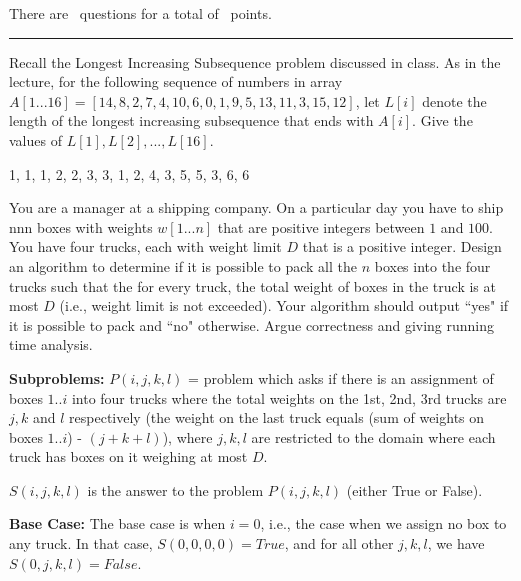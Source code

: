 \documentclass[answers]{exam}
\begin{document}
\vspace{0.1in}


\vspace{0.1in}
There are \numquestions\, questions for a total of \numpoints\, points.
\vspace{0.1in}
\hrule
 \vspace{0.2in}
\begin{questions}
 
\question[3] 

Recall the Longest Increasing Subsequence problem discussed in class. As in the lecture, for the following sequence of numbers in array $A[1...16] = [14,8,2,7,4,10,6,0,1,9,5,13,11,3,15,12]$, let
    $L[i]$ denote the length of the longest increasing subsequence that ends with $A[i]$. Give the values of $L[1], L[2], ..., L[16]$.

    \begin{solution}
1, 1, 1, 2, 2, 3, 3, 1, 2, 4, 3, 5, 5, 3, 6, 6
    \end{solution}

\question[7]
You are a manager at a shipping company. On a particular day you have to ship nnn boxes with weights $w[1...n]$ that are positive integers between $1$ and $100$. You have four trucks, each with weight
    limit $D$ that is a positive integer. Design an algorithm to determine if it is possible to pack all the $n$ boxes into the four trucks such that the for every truck, the total weight of boxes in
    the truck is at most $D$ (i.e., weight limit is not exceeded). Your algorithm should output ``yes" if it is possible to pack and ``no" otherwise. Argue correctness and giving running time analysis.

    \begin{solution}

        \textbf{Subproblems:}
$P(i, j, k, l)$ = problem which asks if there is an assignment of boxes $1..i$ into four trucks where the total weights on the 1st, 2nd, 3rd trucks are $j, k$ and $l$ respectively (the weight on the
        last truck equals (sum of weights on boxes $1..i$) - $(j + k + l)$), where $j, k, l$ are restricted to the domain where each truck has boxes on it weighing at most $D$.

$S(i, j, k, l)$ is the answer to the problem $P(i, j, k, l)$ (either True or False).

        \textbf{Base Case:}
The base case is when $i = 0$, i.e., the case when we assign no box to any truck. In that case, $S(0, 0, 0, 0) = True$, and for all other $j, k, l$, we have $S(0, j, k, l) = False$.


\end{solution}
\end{questions}
\end{document}
